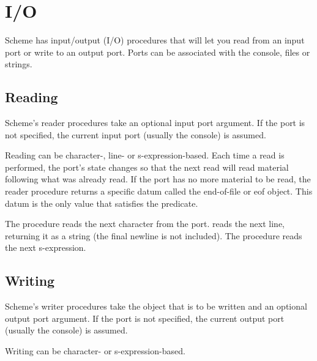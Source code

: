 \chapter{I/O}

Scheme has input/output (I/O) procedures that will let you
read from an input port or write to an output port.  Ports
can be associated with the console, files or strings.

\section{Reading}

Scheme's reader procedures take an optional input port
argument.  If the port is not specified, the current input
port (usually the console) is assumed.


Reading can be character-, line- or s-expression-based.
Each time a read is performed, the port's state changes so
that the next read will read material following what was
already read.  If the port has no more material to be read,
the reader procedure returns a specific datum called the
end-of-file or eof object.  This datum is the only value
that satisfies the  predicate.


The procedure  reads the next character from
the port.   reads the next line, returning it
as a string (the final newline is not included).  The
procedure  reads the next s-expression.

\section{Writing}

Scheme's writer procedures take the object that is to be
written and an optional output port argument.  If the port
is not specified, the current output port (usually the
console) is assumed.

Writing can be character- or s-expression-based.


